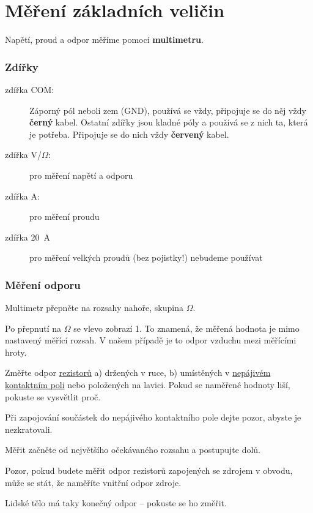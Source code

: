 \section{Měření základních veličin}

Napětí, proud a odpor měříme pomocí \textbf{multimetru}. 

\subsubsection*{Zdířky}

\begin{description}
	\item[zdířka COM:] Záporný pól neboli zem (GND), používá se vždy, připojuje se do něj vždy \textbf{černý} kabel.
	 Ostatní zdířky jsou kladné póly a používá se z nich ta, která je potřeba. Připojuje se do nich vždy \textbf{červený} kabel. 
	\item[zdířka V/$ \Omega $:] pro měření napětí a odporu
	\item[zdířka A:] pro měření proudu
	\item[zdířka 20~A]  pro měření velkých proudů (bez pojistky!) nebudeme používat
\end{description}


\subsubsection*{Měření odporu} 

Multimetr přepněte na rozsahy nahoře, skupina $ \Omega $. 

Po přepnutí na $ \Omega $ se vlevo zobrazí 1. 
To znamená, že měřená hodnota je mimo nastavený měřící rozsah.
V našem případě je to odpor vzduchu mezi měřícími hroty.

Změřte odpor   \hyperref[rezistor]{rezistorů} a) držených v ruce, b) umístěných v 
 \hyperref[nepajive_pole]{nepájivém kontaktním poli} nebo položených na lavici.
Pokud se naměřené hodnoty liší, pokuste se vysvětlit proč. 

Při zapojování součástek do nepájivého kontaktního pole dejte pozor, abyste je nezkratovali.

Měřit začněte od největšího očekávaného rozsahu a postupujte dolů.

Pozor, pokud budete měřit odpor rezistorů zapojených se zdrojem v obvodu, 
může se stát, že naměříte vnitřní odpor zdroje. 

Lidské tělo má taky konečný odpor -- pokuste se ho změřit.


